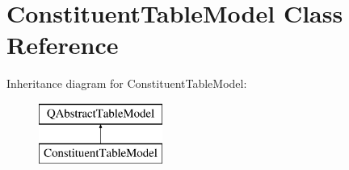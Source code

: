 \hypertarget{class_constituent_table_model}{}\section{Constituent\+Table\+Model Class Reference}
\label{class_constituent_table_model}
Inheritance diagram for Constituent\+Table\+Model\+:\begin{figure}[H]
\begin{center}
\leavevmode
\includegraphics[height=2.000000cm]{class_constituent_table_model}
\end{center}
\end{figure}
